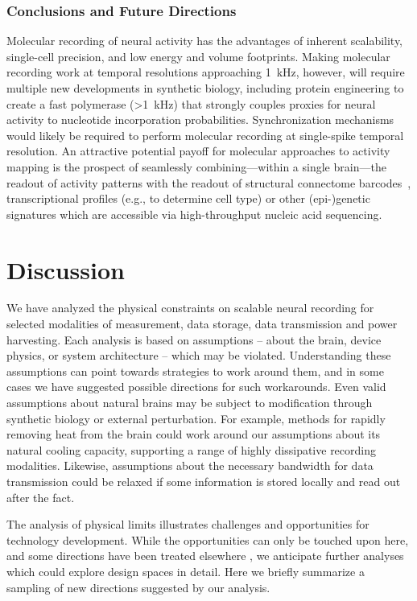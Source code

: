 \subsubsection{Conclusions and Future Directions}

Molecular recording of neural activity has the advantages of inherent scalability, single-cell precision, and low energy and volume footprints.
Making molecular recording work at temporal resolutions approaching \SI{1}{\kHz}, however, will require multiple new developments in synthetic biology, including protein engineering to create a fast polymerase (\SI{>1}{\kHz}) that strongly couples proxies for neural activity to nucleotide incorporation probabilities.
Synchronization mechanisms would likely be required to perform molecular recording at single-spike temporal resolution.
An attractive potential payoff for molecular approaches to activity mapping is the prospect of seamlessly combining---within a single brain---the readout of activity patterns with the readout of structural connectome barcodes~\cite{zador12}, transcriptional profiles \cite{Lee2013InSitu} (e.g., to determine cell type) or other (epi-)genetic signatures which are accessible via high-throughput nucleic acid sequencing.

\section{Discussion}

We have analyzed the physical constraints on scalable neural recording for selected modalities of measurement, data storage, data transmission and power harvesting.
Each analysis is based on assumptions -- about the brain, device physics, or system architecture -- which may be violated.
Understanding these assumptions can point towards strategies to work around them, and in some cases we have suggested possible directions for such workarounds.
Even valid assumptions about natural brains may be subject to modification through synthetic biology or external perturbation.
For example, methods for rapidly removing heat from the brain could work around our assumptions about its natural cooling capacity, supporting a range of highly dissipative recording modalities. Likewise, assumptions about the necessary bandwidth for data transmission could be relaxed if some information is stored locally and read out after the fact.

The analysis of physical limits illustrates challenges and opportunities for technology development. While the opportunities can only be touched upon here, and some directions have been treated elsewhere \cite{Dean2013, alivisatos13, alivisatos2012brain}, we anticipate further analyses which could explore design spaces in detail. Here we briefly summarize a sampling of new directions suggested by our analysis.

